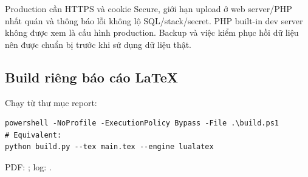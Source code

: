 Production cần HTTPS và cookie Secure, giới hạn upload ở web server/PHP nhất quán và thông báo lỗi không lộ SQL/stack/secret. PHP built-in dev server không được xem là cấu hình production. Backup và việc kiểm phục hồi dữ liệu nên được chuẩn bị trước khi sử dụng dữ liệu thật.

\subsection{Build riêng báo cáo LaTeX}
Chạy từ thư mục report:
\begin{lstlisting}
powershell -NoProfile -ExecutionPolicy Bypass -File .\build.ps1
# Equivalent:
python build.py --tex main.tex --engine lualatex
\end{lstlisting}
PDF: ; log: .
\clearpage
